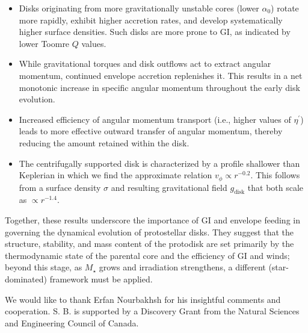 \documentclass[twocolumn,linenumbers]{aastex631}
\begin{document}
\begin{itemize}
  \item Disks originating from more gravitationally unstable cores (lower $\alpha_0$) rotate more rapidly, exhibit higher accretion rates, and develop systematically higher surface densities. Such disks are more prone to GI, as indicated by lower Toomre $Q$ values.
  

  \item While gravitational torques and disk outflows act to extract angular momentum, continued envelope accretion replenishes it. This results in a net monotonic increase in specific angular momentum throughout the early disk evolution.
  \item Increased efficiency of angular momentum transport (i.e., higher values of $\eta^{\prime}$) leads to more effective outward transfer of angular momentum, thereby reducing the amount retained 
  within the disk.
  \item The centrifugally supported disk is characterized by a profile shallower than Keplerian in which we find the approximate relation $v_\phi \propto r^{-0.2}$. This follows from a surface density $\sigma$ and resulting gravitational field $g_{\mathrm{disk}}$ that both scale as $\propto r^{-1.4}$.
\end{itemize}

Together, these results underscore the importance of GI and envelope feeding in governing the dynamical evolution of protostellar disks. They suggest that the structure, stability, and mass content of the protodisk are set primarily by the thermodynamic state of the parental core and the efficiency of GI and winds; beyond this stage, as $M_\star$ grows and irradiation strengthens, a different (star-dominated) framework must be applied.

\begin{acknowledgments} 
We would like to thank 
Erfan Nourbakhsh for his insightful comments and cooperation.
S. B. is supported by a Discovery Grant from the Natural Sciences and Engineering Council of Canada.
\end{acknowledgments}
\end{document}
